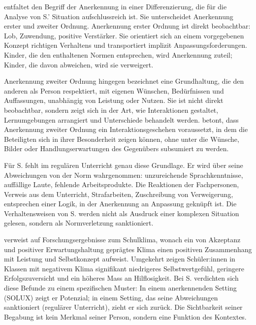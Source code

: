 \documentclass[ngerman, a4paper]{article}
\begin{document}
\textcite[S.\,89\psq]{grossrieder2010anerkennung} entfaltet den Begriff der Anerkennung in einer Differenzierung, die für
die Analyse von S.' Situation aufschlussreich ist. Sie unterscheidet Anerkennung
erster und zweiter Ordnung. Anerkennung erster Ordnung ist direkt beobachtbar: Lob,
Zuwendung, positive Verstärker. Sie orientiert sich an einem vorgegebenen Konzept
richtigen Verhaltens und transportiert implizit Anpassungsforderungen. Kinder, die den
enthaltenen Normen entsprechen, wird Anerkennung zuteil; Kinder, die davon abweichen,
wird sie verweigert.

Anerkennung zweiter Ordnung hingegen bezeichnet eine Grundhaltung, die den anderen als
Person respektiert, mit eigenen Wünschen, Bedürfnissen und Auffassungen, unabhängig
von Leistung oder Nutzen. Sie ist nicht direkt beobachtbar, sondern zeigt sich in der
Art, wie Interaktionen gestaltet, Lernumgebungen arrangiert und Unterschiede behandelt
werden. \textcite[S.\,90\psq]{grossrieder2010anerkennung} betont, dass Anerkennung zweiter Ordnung ein
Interaktionsgeschehen voraussetzt, in dem die Beteiligten sich in ihrer Besonderheit
zeigen können, ohne unter die Wünsche, Bilder oder Handlungserwartungen des
Gegenübers subsumiert zu werden.

Für S. fehlt im regulären Unterricht genau diese Grundlage. Er wird über seine
Abweichungen von der Norm wahrgenommen: unzureichende Sprachkenntnisse,
auffällige Laute, fehlende Arbeitsprodukte. Die Reaktionen der Fachpersonen,
Verweis aus dem Unterricht, Strafarbeiten, Zuschreibung von Verweigerung,
entsprechen einer Logik, in der Anerkennung an Anpassung geknüpft ist. Die
Verhaltensweisen von S. werden nicht als Ausdruck einer komplexen Situation gelesen,
sondern als Normverletzung sanktioniert.

\textcite[S.\,88\psq]{grossrieder2010anerkennung} verweist auf Forschungsergebnisse zum Schulklima, wonach ein von
Akzeptanz und positiver Erwartungshaltung geprägtes Klima einen positiven Zusammenhang
mit Leistung und Selbstkonzept aufweist. Umgekehrt zeigen Schüler:innen in Klassen mit
negativem Klima signifikant niedrigeres Selbstwertgefühl, geringere Erfolgszuversicht
und ein höheres Mass an Hilflosigkeit. Bei S. verdichten sich diese Befunde zu einem
spezifischen Muster: In einem anerkennenden Setting (SOLUX) zeigt er Potenzial; in
einem Setting, das seine Abweichungen sanktioniert (regulärer Unterricht), zieht er
sich zurück. Die Sichtbarkeit seiner Begabung ist kein Merkmal seiner Person, sondern
eine Funktion des Kontextes.
\end{document}
